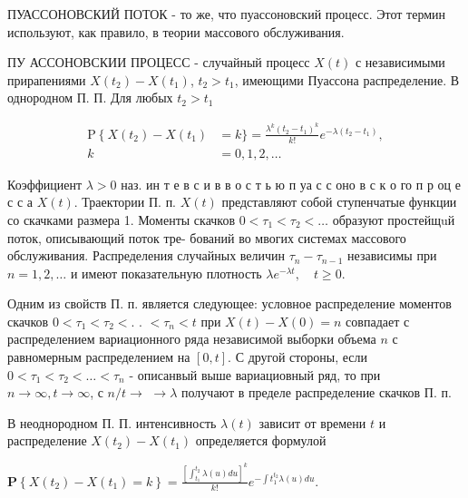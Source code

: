 \documentclass[10pt]{article}
\begin{document}
ПУАССОНОВСКИЙ ПОТОК - то же, что пуассоновский процесс. Этот термин используют, как правило, в теории массового обслуживания.



ПУ АССОНОВСКИИ ПРОЦЕСС - случайный процесс $X(t)$ с независимыми прирапениями $X\left(t_{2}\right)-X\left(t_{1}\right)$, $t_{2}>t_{1}$, имеющими Пуассона распределение. В однородном П. П. Для любых $t_{2}>t_{1}$



\[

\begin{aligned}

\mathrm{P}\left\{X\left(t_{2}\right)-X\left(t_{1}\right)\right. & =k\}=\frac{\lambda^{k}\left(t_{2}-t_{1}\right)^{k}}{k !} e^{-\lambda\left(t_{2}-t_{1}\right)}, \\

k & =0,1,2, \ldots

\end{aligned}

\]



Коэффициент $\lambda>0$ наз. ин т е в с и в в о с т ь ю п уа с с оно в с к о го п р оц е с с а $X(t)$. Траектории П. п. $X(t)$ представляют собой ступенчатые функции со скачками размера 1. Моменты скачков $0<\tau_{1}<\tau_{2}<\ldots$ образуют простейщuй поток, описывающий поток тре- бований во мвогих системах массового обслуживания. Распределения случайных величин $\tau_{n}-\tau_{n-1}$ независимы при $n=1,2, \ldots$ и имеют показательную плотность $\lambda e^{-\lambda t}, \quad t \geqslant 0$.



Одним из свойств П. п. является следующее: условное распределение моментов скачков $0<\tau_{1}<\tau_{2}<$. . $<\tau_{n}<t$ при $X(t)-X(0)=n$ совпадает с распределением вариационного ряда независимой выборки объема $n$ с равномерным распределением на $[0, t]$. С другой стороны, если $0<\tau_{1}<\tau_{2}<\ldots<\tau_{n}$ - описанвый выше вариациовный ряд, то при $n \rightarrow \infty, t \rightarrow \infty$, с $n / t \rightarrow$ $\rightarrow \lambda$ получают в пределе распределение скачков П. п.



В неоднородном П. П. интенсивность $\lambda(t)$ зависит от времени $t$ и распределение $X\left(t_{2}\right)-X\left(t_{1}\right)$ определяется формулой



$\mathbf{P}\left\{X\left(t_{2}\right)-X\left(t_{1}\right)=k\right\}=\frac{\left[\int_{t_{1}}^{t_{2}} \lambda(u) d u\right]^{k}}{k !} e^{-\int t_{1}^{t_{2}} \lambda(u) d u}$.
\end{document}
